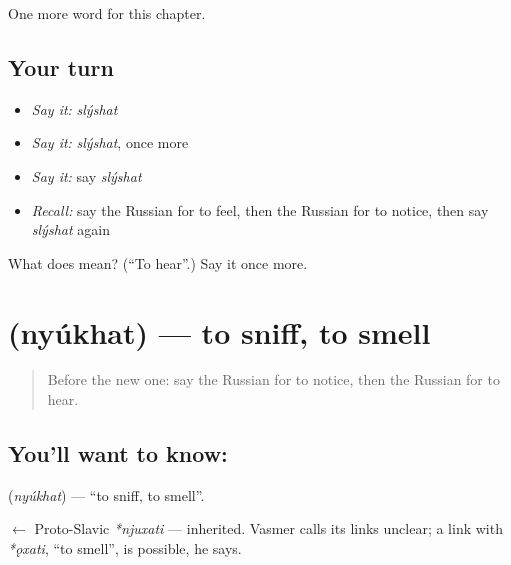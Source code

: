 \begin{grammarlens}[title={What you've built}]
One more word for this chapter.
\end{grammarlens}

\subsection*{Your turn}
\begin{itemize}
\raggedright
  \item \emph{Say it:} \emph{slýshat}
  \item \emph{Say it:} \emph{slýshat}, once more
  \item \emph{Say it:} say \emph{slýshat}
  \item \emph{Recall:} say the Russian for to feel, then the Russian for to notice, then say \emph{slýshat} again
\end{itemize}

\begin{tcolorbox}[breakable,colback=teal!4,colframe=teal!35!black,title={Before you move on}]
What does  mean? (\textquotedblleft{}To hear\textquotedblright{}.) Say it once more.
\end{tcolorbox}
\section[\texorpdfstring{\ru{нюхать} (nyúkhat)}{нюхать (nyúkhat)}]{ (nyúkhat) — to sniff, to smell}

\label{lesson:RU-C208-nyukhat}



\begin{quote}
Before the new one: say the Russian for to notice, then the Russian for to hear.
\end{quote}

\subsection*{You'll want to know: }
\textbf{} (\emph{nyúkhat}) — \textquotedblleft{}to sniff, to smell\textquotedblright{}.

\begin{cousinweb}
\textbf{} $\leftarrow$ Proto-Slavic \emph{*njuxati} — inherited. Vasmer calls its links unclear; a link with \emph{*ǫxati}, \textquotedblleft{}to smell\textquotedblright{}, is possible, he says.
\end{cousinweb}


